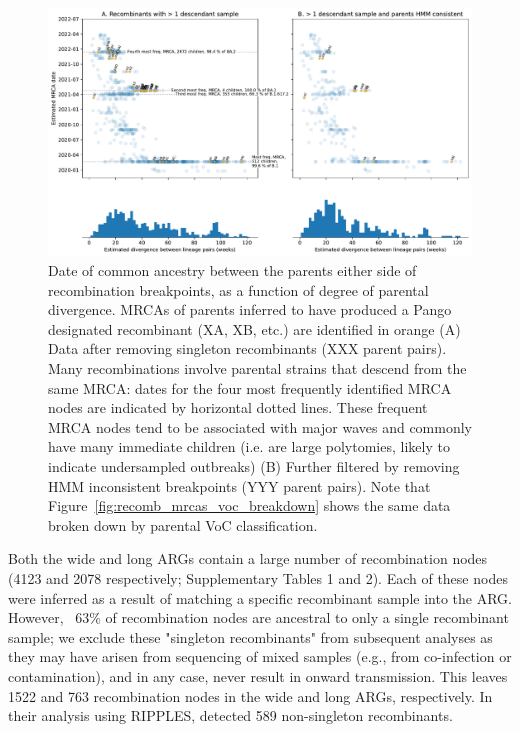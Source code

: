 \documentclass{article}
\begin{document}
\begin{figure} \centering
\includegraphics[width=\textwidth]{figures/recombination_node_mrcas.pdf}
\caption{\label{fig:recomb_mrcas}
Date of common ancestry between the parents either side of recombination
breakpoints, as a function of degree of parental divergence. MRCAs of parents
inferred to have produced a Pango designated recombinant (XA, XB, etc.) are
identified in orange (A) Data after removing singleton recombinants (XXX parent
pairs). Many recombinations involve parental strains that descend from the same
MRCA: dates for the four most frequently identified MRCA nodes are indicated by
horizontal dotted lines. These frequent MRCA nodes tend to be associated with
major waves and commonly have many immediate children (i.e. are large
polytomies, likely to indicate undersampled outbreaks) (B) Further filtered by
removing HMM inconsistent breakpoints (YYY parent pairs). Note that
Figure~\ref{fig:recomb_mrcas_voc_breakdown} shows the same data broken down by
parental VoC classification.}
\end{figure}

Both the wide and long ARGs contain a large number of recombination nodes (4123
and 2078 respectively; Supplementary Tables 1 and 2). Each of these nodes were
inferred as a result of matching a specific recombinant sample into the ARG.
However, ~63\% of recombination nodes are ancestral to only a single
recombinant sample; we exclude these "singleton recombinants" from subsequent
analyses as they may have arisen from sequencing of mixed samples (e.g., from
co-infection or contamination), and in any case, never result in onward
transmission.  This leaves 1522 and 763 recombination nodes in the wide and
long ARGs, respectively. In their analysis using RIPPLES,
\cite{Turakhia2022-it} detected 589 non-singleton recombinants.
\end{document}
